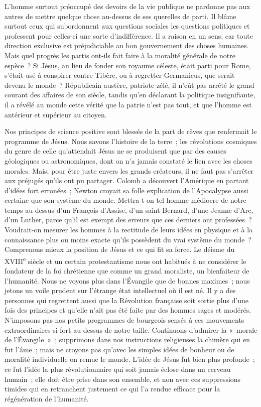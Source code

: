 \documentclass[french,twoside]{book} %
\begin{document}
L’homme surtout préoccupé des devoirs de la vie publique ne pardonne pas aux autres de mettre quelque chose au-dessus de ses querelles de parti. Il blâme surtout ceux qui subordonnent aux questions sociales les questions politiques et professent pour celles-ci une sorte d’indifférence. Il a raison en un sens, car toute direction exclusive est préjudiciable au bon gouvernement des choses humaines. Mais quel progrès les partis ont-ils fait faire à la moralité générale de notre espèce ? Si Jésus, au lieu de fonder son royaume céleste, était parti pour Rome, s’était usé à conspirer contre Tibère, ou à regretter Germanicus, que serait devenu le monde ? Républicain austère, patriote zélé, il n’eût pas arrêté le grand courant des affaires de son siècle, tandis qu’en déclarant la politique insignifiante, il a révélé au monde cette vérité que la patrie n’est pas tout, et que l’homme est antérieur et supérieur au citoyen.\par
Nos principes de science positive sont blessés de la part de rêves que renfermait le programme de Jésus. Nous savons l’histoire de la terre ; les révolutions cosmiques du genre de celle qu’attendait Jésus ne se produisent que par des causes géologiques ou astronomiques, dont on n’a jamais constaté le lien avec les choses morales. Mais, pour être juste envers les grands créateurs, il ne faut pas s’arrêter aux préjugés qu’ils ont pu partager. Colomb a découvert l’Amérique en partant d’idées fort erronées ; Newton croyait sa folle explication de l’Apocalypse aussi certaine que son système du monde. Mettra-t-on tel homme médiocre de notre temps au-dessus d’un François d’Assise, d’un saint Bernard, d’une Jeanne d’Arc, d’un Luther, parce qu’il est exempt des erreurs que ces derniers ont professées ? Voudrait-on mesurer les hommes à la rectitude de leurs idées en physique et à la connaissance plus ou moins exacte qu’ils possèdent du vrai système du monde ? Comprenons mieux la position de Jésus et ce qui fit sa force. Le déisme du XVIII\textsuperscript{e} siècle et un certain protestantisme nous ont habitués à ne considérer le fondateur de la foi chrétienne que comme un grand moraliste, un bienfaiteur de l’humanité. Nous ne voyons plus dans l’Évangile que de bonnes maximes ; nous jetons un voile prudent sur l’étrange état intellectuel où il est né. Il y a des personnes qui regrettent aussi que la Révolution française soit sortie plus d’une fois des principes et qu’elle n’ait pas été faite par des hommes sages et modérés. N’imposons pas nos petits programmes de bourgeois sensés à ces mouvements extraordinaires si fort au-dessus de notre taille. Continuons d’admirer la « morale de l’Évangile » ; supprimons dans nos instructions religieuses la chimère qui en fut l’âme ; mais ne croyons pas qu’avec les simples idées de bonheur ou de moralité individuelle on remue le monde. L’idée de Jésus fut bien plus profonde ; ce fut l’idée la plus révolutionnaire qui soit jamais éclose dans un cerveau humain ; elle doit être prise dans son ensemble, et non avec ces suppressions timides qui en retranchent justement ce qui l’a rendue efficace pour la régénération de l’humanité.\par
\end{document}

